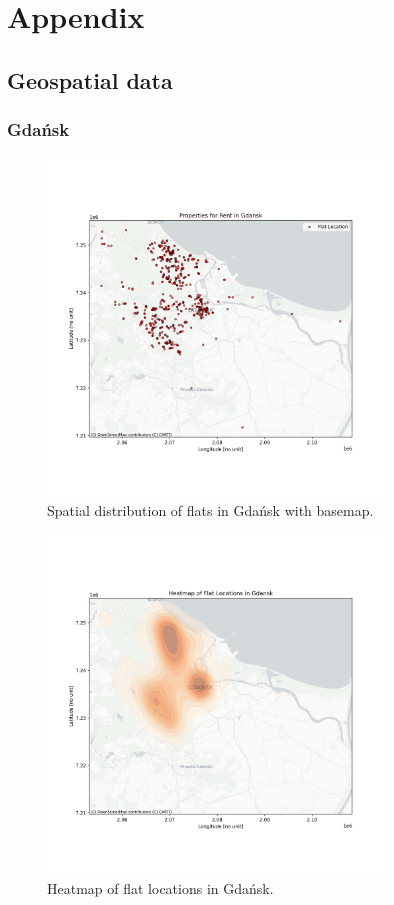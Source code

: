 \section{Appendix} \label{appendix}
\subsection{Geospatial data}
    \subsubsection{Gdańsk}
    \begin{figure}[H]
        \centering
        \includegraphics[width=0.8\textwidth]{figures/gdansk_flats_map_with_basemap.png}
        \caption{Spatial distribution of flats in Gdańsk with basemap.}
        \label{fig:gdansk_basemap}
    \end{figure}

    \begin{figure}[H]
        \centering
        \includegraphics[width=0.8\textwidth]{figures/gdansk_heatmap.png}
        \caption{Heatmap of flat locations in Gdańsk.}
        \label{fig:gdansk_heatmap}
    \end{figure}

